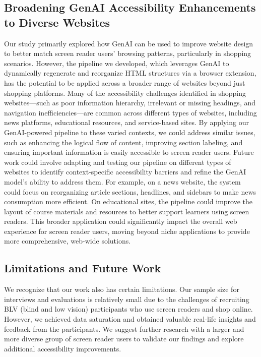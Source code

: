 \subsection{Broadening GenAI Accessibility Enhancements to Diverse Websites}
Our study primarily explored how GenAI can be used to improve website design to better match screen reader users' browsing patterns, particularly in shopping scenarios. However, the pipeline we developed, which leverages GenAI to dynamically regenerate and reorganize HTML structures via a browser extension, has the potential to be applied across a broader range of websites beyond just shopping platforms. Many of the accessibility challenges identified in shopping websites—such as poor information hierarchy, irrelevant or missing headings, and navigation inefficiencies—are common across different types of websites, including news platforms, educational resources, and service-based sites. By applying our GenAI-powered pipeline to these varied contexts, we could address similar issues, such as enhancing the logical flow of content, improving section labeling, and ensuring important information is easily accessible to screen reader users. Future work could involve adapting and testing our pipeline on different types of websites to identify context-specific accessibility barriers and refine the GenAI model’s ability to address them. For example, on a news website, the system could focus on reorganizing article sections, headlines, and sidebars to make news consumption more efficient. On educational sites, the pipeline could improve the layout of course materials and resources to better support learners using screen readers. This broader application could significantly impact the overall web experience for screen reader users, moving beyond niche applications to provide more comprehensive, web-wide solutions.

\subsection{Limitations and Future Work}
\label{sec:limitation}
We recognize that our work also has certain limitations. Our sample size for interviews and evaluations is relatively small due to the challenges of recruiting BLV (blind and low vision) participants who use screen readers and shop online. However, we achieved data saturation and obtained valuable real-life insights and feedback from the participants. We suggest further research with a larger and more diverse group of screen reader users to validate our findings and explore additional accessibility improvements.




